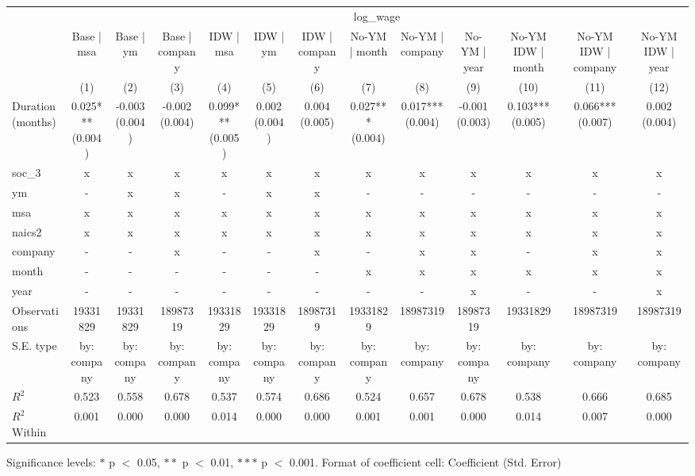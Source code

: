 \renewcommand\cellalign{t}
\begin{threeparttable}
\begin{tabular}{lcccccccccccc}
\toprule
 & \multicolumn{12}{c}{log\_wage} \\
\cmidrule(lr){2-13} 
 & Base | msa & Base | ym & Base | company & IDW | msa & IDW | ym & IDW | company & No-YM | month & No-YM | company & No-YM | year & No-YM IDW | month & No-YM IDW | company & No-YM IDW | year \\
 & (1) & (2) & (3) & (4) & (5) & (6) & (7) & (8) & (9) & (10) & (11) & (12) \\
\midrule
\addlinespace
Duration (months) & \makecell{0.025*** \\ (0.004)} & \makecell{-0.003 \\ (0.004)} & \makecell{-0.002 \\ (0.004)} & \makecell{0.099*** \\ (0.005)} & \makecell{0.002 \\ (0.004)} & \makecell{0.004 \\ (0.005)} & \makecell{0.027*** \\ (0.004)} & \makecell{0.017*** \\ (0.004)} & \makecell{-0.001 \\ (0.003)} & \makecell{0.103*** \\ (0.005)} & \makecell{0.066*** \\ (0.007)} & \makecell{0.002 \\ (0.004)} \\
\midrule
\addlinespace
soc\_3 & x & x & x & x & x & x & x & x & x & x & x & x \\
ym & - & x & x & - & x & x & - & - & - & - & - & - \\
msa & x & x & x & x & x & x & x & x & x & x & x & x \\
naics2 & x & x & x & x & x & x & x & x & x & x & x & x \\
company & - & - & x & - & - & x & - & x & x & - & x & x \\
month & - & - & - & - & - & - & x & x & x & x & x & x \\
year & - & - & - & - & - & - & - & - & x & - & - & x \\
\midrule
\addlinespace
Observations & 19331829 & 19331829 & 18987319 & 19331829 & 19331829 & 18987319 & 19331829 & 18987319 & 18987319 & 19331829 & 18987319 & 18987319 \\
S.E. type & by: company & by: company & by: company & by: company & by: company & by: company & by: company & by: company & by: company & by: company & by: company & by: company \\
$R^2$ & 0.523 & 0.558 & 0.678 & 0.537 & 0.574 & 0.686 & 0.524 & 0.657 & 0.678 & 0.538 & 0.666 & 0.685 \\
$R^2$ Within & 0.001 & 0.000 & 0.000 & 0.014 & 0.000 & 0.000 & 0.001 & 0.001 & 0.000 & 0.014 & 0.007 & 0.000 \\
\bottomrule
\end{tabular}
\footnotesize Significance levels: $*$ p $<$ 0.05, $**$ p $<$ 0.01, $***$ p $<$ 0.001. Format of coefficient cell: Coefficient 
 (Std. Error)
\end{threeparttable}